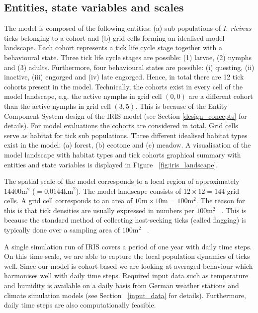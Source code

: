 \documentclass[a4paper, 11pt]{scrartcl}
\begin{document}
\subsection{Entities, state variables and scales}
The model is composed of the following entities: (a) sub populations of \textit{I. ricinus} ticks belonging to a cohort and (b) grid cells forming an idealised model landscape. Each cohort represents a tick life cycle stage together with a behavioural state. Three tick life cycle stages are possible: (1) larvae, (2) nymphs and (3) adults. Furthermore, four behavioural states are possible: (i) questing, (ii) inactive, (iii) engorged and (iv) late engorged. Hence, in total there are 12 tick cohorts present in the model. Technically, the cohorts exist in every cell of the model landscape, e.g. the active nymphs in grid cell $(0,0)$ are a different cohort than the active nymphs in grid cell $(3,5)$. This is because of the Entity Component System design of the IRIS model (see Section \ref{design_concepts} for details). For model evaluations the cohorts are considered in total. Grid cells serve as habitat for tick sub populations. Three different idealised habitat types exist in the model: (a) forest, (b) ecotone and (c) meadow. A visualisation of the model landscape with habitat types and tick cohorts graphical summary with entities and state variables is displayed in Figure ~\ref{fig:iris_landscape}.

The spatial scale of the model corresponds to a local region of approximately $14400 \mathrm{m}^{2}$ ($= 0.0144 \mathrm{km}^{2}$). The model landscape consists of $12 \times 12 = 144$ grid cells. A grid cell corresponds to an area of $10 \mathrm{m} \times 10 \mathrm{m} = 100 \mathrm{m}^{2}$. The reason for this is that tick densities are usually expressed in numbers per $100 \mathrm{m}^{2}$ ~\parencite[see e.g.][Table 2]{Boehnke.2015}. This is because the standard method of collecting host-seeking ticks (called flagging) is typically done over a sampling area of $100 \mathrm{m}^{2}$ ~\parencite{Brugger.2016, Schulz.2014}.

A single simulation run of IRIS covers a period of one year with daily time steps. On this time scale, we are able to capture the local population dynamics of ticks well. Since our model is cohort-based we are looking at averaged behaviour which harmonises well with daily time steps. Required input data such as temperature and humidity is available on a daily basis from German weather stations and climate simulation models (see Section ~\ref{input_data} for details). Furthermore, daily time steps are also computationally feasible.
\end{document}
